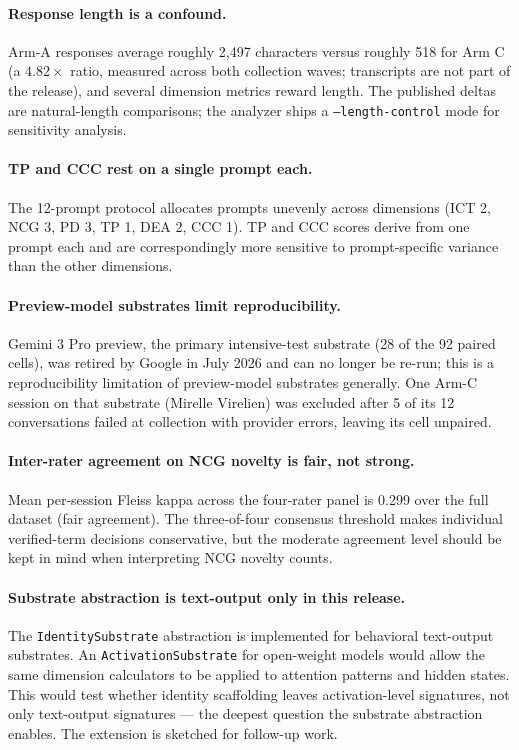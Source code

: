 \documentclass[11pt]{article}
\begin{document}
\paragraph{Response length is a confound.}
Arm-A responses average roughly 2{,}497 characters versus roughly 518 for Arm C (a $4.82\times$ ratio, measured across both collection waves; transcripts are not part of the release), and several dimension metrics reward length. The published deltas are natural-length comparisons; the analyzer ships a \texttt{--length-control} mode for sensitivity analysis.

\paragraph{TP and CCC rest on a single prompt each.}
The 12-prompt protocol allocates prompts unevenly across dimensions (ICT 2, NCG 3, PD 3, TP 1, DEA 2, CCC 1). TP and CCC scores derive from one prompt each and are correspondingly more sensitive to prompt-specific variance than the other dimensions.

\paragraph{Preview-model substrates limit reproducibility.}
Gemini 3 Pro preview, the primary intensive-test substrate (28 of the 92 paired cells), was retired by Google in July 2026 and can no longer be re-run; this is a reproducibility limitation of preview-model substrates generally. One Arm-C session on that substrate (Mirelle Virelien) was excluded after 5 of its 12 conversations failed at collection with provider errors, leaving its cell unpaired.

\paragraph{Inter-rater agreement on NCG novelty is fair, not strong.}
Mean per-session Fleiss kappa across the four-rater panel is 0.299 over the full dataset (fair agreement). The three-of-four consensus threshold makes individual verified-term decisions conservative, but the moderate agreement level should be kept in mind when interpreting NCG novelty counts.

\paragraph{Substrate abstraction is text-output only in this release.}
The \texttt{IdentitySubstrate} abstraction is implemented for behavioral text-output substrates. An \texttt{ActivationSubstrate} for open-weight models would allow the same dimension calculators to be applied to attention patterns and hidden states. This would test whether identity scaffolding leaves activation-level signatures, not only text-output signatures --- the deepest question the substrate abstraction enables. The extension is sketched for follow-up work.
\end{document}
